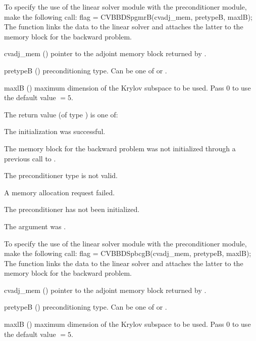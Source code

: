 {}
To specify the use of the {\cvspgmr} linear solver module with the {\cvbbdpre} 
preconditioner module, make the following call:
{
  flag = CVBBDSpgmrB(cvadj\_mem, pretypeB, maxlB);
}
{
  The function  links the {\cvbbdpre} data to the
  {\cvspgmr} linear solver and attaches the latter to the {\cvodes}
  memory block for the backward problem.
}
{
  \begin{args}
  \item[cvadj\_mem] ()
    pointer to the adjoint memory block returned by .
  \item[pretypeB] ()
    preconditioning type. Can be one of  or .
  \item[maxlB] ()
    maximum dimension of the Krylov subspace to be used. Pass $0$ to use the 
    default value $=5$.
  \end{args}
}
{
  The return value  (of type ) is one of:
  \begin{args}
  \item[\Id{CVSPILS\_SUCCESS}] 
    The {\cvspgmr} initialization was successful.
  \item[\Id{CVSPILS\_MEM\_NULL}]
    The {\cvodes} memory block for the backward problem was not initialized through a 
    previous call to .
  \item[\Id{CVSPILS\_ILL\_INPUT}]
    The preconditioner type  is not valid.
  \item[\Id{CVSPILS\_MEM\_FAIL}]
    A memory allocation request failed.
  \item[\Id{CVBBDPRE\_PDATA\_NULL}]
    The {\cvbbdpre} preconditioner has not been initialized.
  \item[\Id{CVBBDPRE\_ADJMEM\_NULL}]
    The  argument was .
  \end{args}
}
{}
To specify the use of the {\cvspbcg} linear solver module with the {\cvbbdpre} 
preconditioner module, make the following call:
{
  flag = CVBBDSpbcgB(cvadj\_mem, pretypeB, maxlB);
}
{
  The function  links the {\cvbbdpre} data to the
  {\cvspbcg} linear solver and attaches the latter to the {\cvodes}
  memory block for the backward problem.
}
{
  \begin{args}
  \item[cvadj\_mem] ()
    pointer to the adjoint memory block returned by .
  \item[pretypeB] ()
    preconditioning type. Can be one of  or .
  \item[maxlB] ()
    maximum dimension of the Krylov subspace to be used. Pass $0$ to use the 
    default value $=5$.
  \end{args}
}
